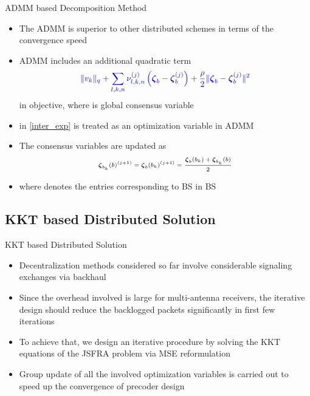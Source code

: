 \documentclass[9pt]{beamer}
\begin{document}
\begin{frame}{ADMM based Decomposition Method}
	\begin{itemize}
		\item The \ac{ADMM} is superior to other distributed schemes in terms of the convergence speed
		\item \ac{ADMM} includes an additional quadratic term 
		\begin{equation}
		\color{blue} \|v_k\|_q + \sum_{l,k,n} \nu_{l,k,n}^{(j)} \left ( {\boldsymbol{\zeta}}_b - {\boldsymbol{\zeta}}^{(j)}_b \right ) + \frac{\rho}{2}  \| {\boldsymbol{\zeta}}_b - {\boldsymbol{\zeta}}^{(j)}_b \|^2
		\end{equation}
		in objective, where  is global consensus variable
		\item {} in \eqref{inter_exp} is treated as an optimization variable in \ac{ADMM}
		\item The consensus variables are updated as
		\begin{equation} \scriptsize
		{\boldsymbol{\zeta}}_{b_k}(b)^{(j+1)} = {\boldsymbol{\zeta}}_{b}(b_k)^{(j+1)} = \frac{{\boldsymbol{\zeta}}_{b}(b_k) + {\boldsymbol{\zeta}}_{b_k}(b)}{2}
		\end{equation}
		\item where  denotes the entries corresponding to \ac{BS}  in \ac{BS} 
	\end{itemize}
\end{frame}

\subsection{KKT based Distributed Solution}

\begin{frame}{KKT based Distributed Solution}
	\begin{itemize}
		\item Decentralization methods considered so far involve considerable signaling exchanges via backhaul
		\item Since the overhead involved is large for multi-antenna receivers, the iterative design should reduce the backlogged packets significantly in first few iterations
		\item To achieve that, we design an iterative procedure by solving the \ac{KKT} equations of the \acs{JSFRA} problem via \acs{MSE} reformulation
		\item Group update of all the involved optimization variables is carried out to speed up the convergence of precoder design
	\end{itemize}
\end{frame}
\end{document}
